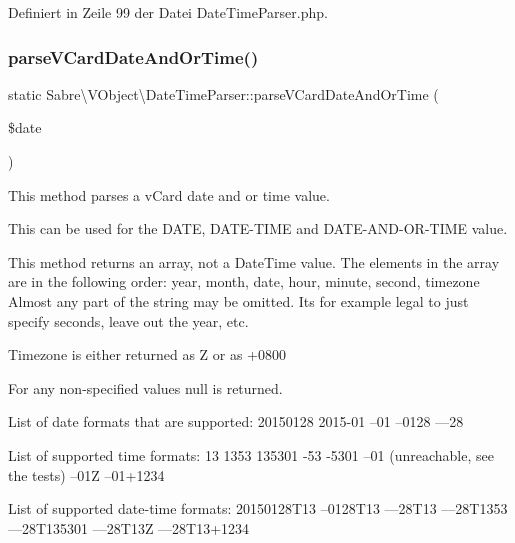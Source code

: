 Definiert in Zeile 99 der Datei Date\+Time\+Parser.\+php.

\mbox{\label{class_sabre_1_1_v_object_1_1_date_time_parser_a148b5f57f80dbe7fd35b088b0ba479d9}} 
\subsubsection{\texorpdfstring{parse\+V\+Card\+Date\+And\+Or\+Time()}{parseVCardDateAndOrTime()}}
{\footnotesize\ttfamily static Sabre\textbackslash{}\+V\+Object\textbackslash{}\+Date\+Time\+Parser\+::parse\+V\+Card\+Date\+And\+Or\+Time (\begin{DoxyParamCaption}\item[{}]{\$date }\end{DoxyParamCaption})\hspace{0.3cm}{\ttfamily [static]}}

This method parses a v\+Card date and or time value.

This can be used for the D\+A\+TE, D\+A\+T\+E-\/\+T\+I\+ME and D\+A\+T\+E-\/\+A\+N\+D-\/\+O\+R-\/\+T\+I\+ME value.

This method returns an array, not a Date\+Time value. The elements in the array are in the following order\+: year, month, date, hour, minute, second, timezone Almost any part of the string may be omitted. It\textquotesingle{}s for example legal to just specify seconds, leave out the year, etc.

Timezone is either returned as \textquotesingle{}Z\textquotesingle{} or as \textquotesingle{}+0800\textquotesingle{}

For any non-\/specified values null is returned.

List of date formats that are supported\+: 20150128 2015-\/01 --01 --0128 ---28

List of supported time formats\+: 13 1353 135301 -\/53 -\/5301 --01 (unreachable, see the tests) --01Z --01+1234

List of supported date-\/time formats\+: 20150128\+T13 --0128\+T13 ---28\+T13 ---28\+T1353 ---28\+T135301 ---28\+T13Z ---28\+T13+1234

